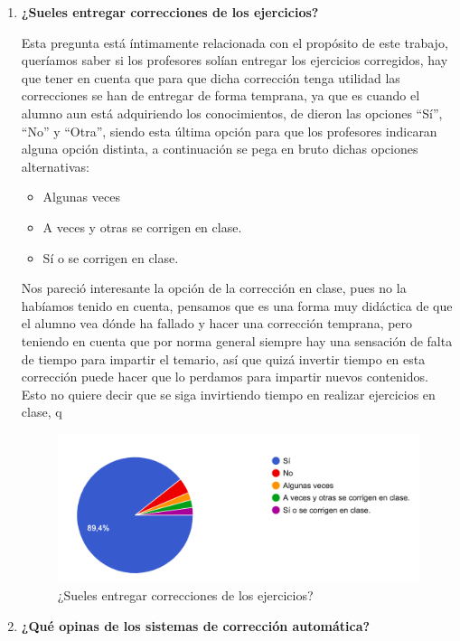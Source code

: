 \begin{enumerate}
\item \textbf{¿Sueles entregar correcciones de los ejercicios?}

Esta pregunta está íntimamente relacionada con el propósito de este trabajo, queríamos saber si los profesores solían entregar los ejercicios corregidos, hay que tener en cuenta que para que dicha corrección tenga utilidad las correcciones se han de entregar de forma temprana, ya que es cuando el alumno aun está adquiriendo los conocimientos, de dieron las opciones ``Sí'', ``No'' y ``Otra'', siendo esta última opción para que los profesores indicaran alguna opción distinta, a continuación se pega en bruto dichas opciones alternativas:

\begin{itemize}
    \item Algunas veces
    \item A veces y otras se corrigen en clase.
    \item Sí o se corrigen en clase.
\end{itemize}

Nos pareció interesante la opción de la corrección en clase, pues no la habíamos tenido en cuenta, pensamos que es una forma muy didáctica de que el alumno vea dónde ha fallado y hacer una corrección temprana, pero teniendo en cuenta que por norma general siempre hay una sensación de falta de tiempo para impartir el temario, así que quizá invertir tiempo en esta corrección puede hacer que lo perdamos para impartir nuevos contenidos. Esto no quiere decir que se siga invirtiendo tiempo en realizar ejercicios en clase, q

\begin{figure}[H]
\centering
\includegraphics[width=1.0\textwidth]{../images/quiz_5}
\caption{¿Sueles entregar correcciones de los ejercicios?}
\label{fig:quiz_5}
\end{figure}

\item \textbf{¿Qué opinas de los sistemas de corrección automática?}


\end{enumerate}
